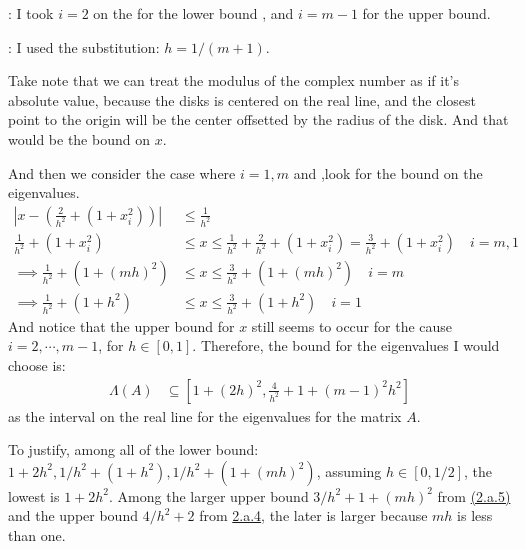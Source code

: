 \documentclass[]{article}
\begin{document}
        \par
        [1]: I took $i = 2$ on the for the lower bound , and $i = m - 1$ for the upper bound.
        \par
        [2]: I used the substitution: $h = 1/(m + 1)$. 
        \par
        Take note that we can treat the modulus of the complex number as if it's absolute value, because the disks is centered on the real line, and the closest point to the origin will be the center offsetted by the radius of the disk. And that would be the bound on $x$. 
        \par
        And then we consider the case where $i = 1, m$ and ,look for the bound on the eigenvalues. 
        \begin{align*}\tag{2.a.5}\label{eqn:2.a.5}
            \left| 
                x - \left(
                    \frac{2}{h^2} + (1 + x_i^2)
                \right) 
            \right| &\le \frac{1}{h^2}
            \\
            \frac{1}{h^2} + (1 + x_i^2) &\le  x 
            \le     \frac{1}{h^2} + \frac{2}{h^2}
            + (1 + x_i^2)
            = \frac{3}{h^2} + (1 + x_i^2) \quad i = m, 1
            \\\implies
            \frac{1}{h^2} + (1 + (mh)^2) &\le x \le 
            \frac{3}{h^2} + (1 + (mh)^2) \quad i = m
            \\\implies 
            \frac{1}{h^2} + (1 + h^2) &\le x \le 
            \frac{3}{h^2} + (1 + h^2) \quad i = 1
        \end{align*}
        And notice that the upper bound for $x$ still seems to occur for the cause $i = 2, \cdots, m - 1$, for $h\in [0, 1]$. Therefore, the bound for the eigenvalues I would choose is: 
        \begin{align*}\tag{2.a.6}\label{eqn:2.a.6}
            \Lambda(A) &\subseteq
            \left[
                1 + (2h)^2, 
                \frac{4}{h^2} + 1 + (m -1)^2h^2
            \right]
        \end{align*}
        as the interval on the real line for the eigenvalues for the matrix $A$. 
        \par
        To justify, among all of the lower bound: $1 + 2h^2, 1/h^2 + (1 + h^2), 1/h^2 + (1 + (mh)^2)$, assuming $h \in [0, 1/2]$, the lowest is $1 + 2h^2$. Among the larger upper bound $3/h^2 + 1 + (mh)^2$ from \hyperref[eqn:2.a.5]{(2.a.5)} and the upper bound $4/h^2 + 2$ from \hyperref[eqn:2.a.4]{2.a.4}, the later is larger because $mh$ is less than one. 
\end{document}

